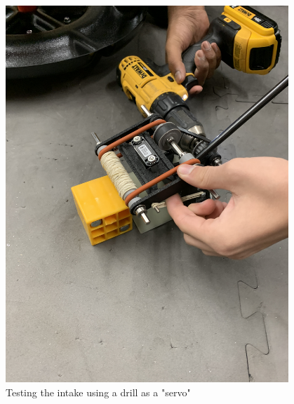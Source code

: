 \begin{figure}[ht]
\centering
\begin{minipage}[b]{.48\textwidth}
  \centering
  \includegraphics[width=0.95\textwidth, angle=0]{Meetings/December/12-30-21/12-30-21_Hardware_Figure5 - Nathan Forrer.JPG}
  \caption{Testing the intake using a drill as a "servo"}
  \label{fig:123021_5}
\end{minipage}%
\hfill%
\begin{minipage}[b]{.48\textwidth}
  \centering

\end{minipage}
\end{figure}
